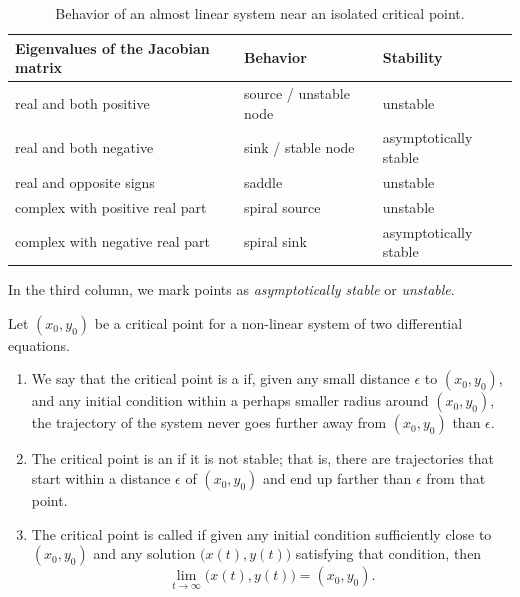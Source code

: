 \begin{table}[h!t]
\mybeginframe
\capstart
\begin{center}
\begin{tabular}{@{}lll@{}}
\toprule
Eigenvalues of the Jacobian matrix & Behavior & Stability \\
\midrule
real and both positive & source / unstable node & unstable \\
real and both negative & sink / stable node & asymptotically stable \\
real and opposite signs & saddle & unstable \\
complex with positive real part & spiral source & unstable \\
complex with negative real part & spiral sink & asymptotically stable \\
\bottomrule
\end{tabular}
\end{center}
\caption{Behavior of an almost linear system near an isolated critical
point.  \label{pln:behtab2}}
\myendframe
\end{table}

In the third column,
we mark points as \emph{asymptotically stable} or \emph{unstable}.  
\begin{definition}
Let $(x_0, y_0)$ be a critical point for a non-linear system of two differential equations.
\begin{enumerate}[1.]
\item We say that the critical point is a \emph{} if, given any small distance $\epsilon$ to
$(x_0,y_0)$, and any initial condition within a perhaps smaller radius
around $(x_0,y_0)$, the trajectory
of the system never goes further away from $(x_0,y_0)$ than $\epsilon$.
\item The critical point is an \emph{} if it is not stable; that is, there are trajectories that start within a distance $\epsilon$ of $(x_0, y_0)$ and end up farther than $\epsilon$ from that point.
\item The critical point is called \emph{} if
given any initial condition sufficiently close to $(x_0,y_0)$ and any
solution $\bigl( x(t), y(t) \bigr)$ satisfying that condition, then
\begin{equation*}
\lim_{t \to \infty} \bigl( x(t), y(t) \bigr) = (x_0,y_0) .
\end{equation*}
\end{enumerate}
\end{definition}

